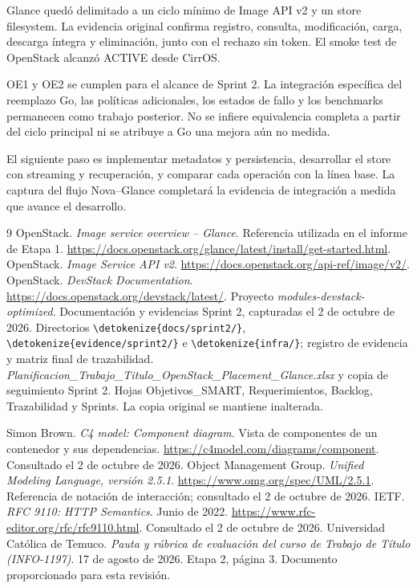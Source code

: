 \documentclass[12pt,a4paper]{article}
\newcommand{\code}[1]{{\small\expandafter\nolinkurl\expandafter{\detokenize{#1}}}}
\begin{document}
Glance quedó delimitado a un ciclo mínimo de Image API v2 y un store filesystem. La evidencia original confirma registro, consulta, modificación, carga, descarga íntegra y eliminación, junto con el rechazo sin token. El smoke test de OpenStack alcanzó ACTIVE desde CirrOS.

OE1 y OE2 se cumplen para el alcance de Sprint 2. La integración específica del reemplazo Go, las políticas adicionales, los estados de fallo y los benchmarks permanecen como trabajo posterior. No se infiere equivalencia completa a partir del ciclo principal ni se atribuye a Go una mejora aún no medida.

El siguiente paso es implementar metadatos y persistencia, desarrollar el store con streaming y recuperación, y comparar cada operación con la línea base. La captura del flujo Nova--Glance completará la evidencia de integración a medida que avance el desarrollo.

\Needspace{280pt}
\begingroup\small
{}
\begin{thebibliography}{9}
 OpenStack. \textit{Image service overview -- Glance}. Referencia utilizada en el informe de Etapa 1. \url{https://docs.openstack.org/glance/latest/install/get-started.html}.
 OpenStack. \textit{Image Service API v2}. \url{https://docs.openstack.org/api-ref/image/v2/}.
 OpenStack. \textit{DevStack Documentation}. \url{https://docs.openstack.org/devstack/latest/}.
 Proyecto \textit{modules-devstack-optimized}. Documentación y evidencias Sprint 2, capturadas el 2 de octubre de 2026. Directorios \code{docs/sprint2/}, \code{evidence/sprint2/} e \code{infra/}; registro de evidencia y matriz final de trazabilidad.
 \textit{Planificacion\_Trabajo\_Titulo\_OpenStack\_Placement\_Glance.xlsx} y copia de seguimiento Sprint 2. Hojas Objetivos\_SMART, Requerimientos, Backlog, Trazabilidad y Sprints. La copia original se mantiene inalterada.

 Simon Brown. \textit{C4 model: Component diagram}. Vista de componentes de un contenedor y sus dependencias. \url{https://c4model.com/diagrams/component}. Consultado el 2 de octubre de 2026.
 Object Management Group. \textit{Unified Modeling Language, versión 2.5.1}. \url{https://www.omg.org/spec/UML/2.5.1}. Referencia de notación de interacción; consultado el 2 de octubre de 2026.
 IETF. \textit{RFC 9110: HTTP Semantics}. Junio de 2022. \url{https://www.rfc-editor.org/rfc/rfc9110.html}. Consultado el 2 de octubre de 2026.
 Universidad Católica de Temuco. \textit{Pauta y rúbrica de evaluación del curso de Trabajo de Título (INFO-1197)}. 17 de agosto de 2026. Etapa 2, página 3. Documento proporcionado para esta revisión.
\end{thebibliography}
\endgroup
\end{document}

